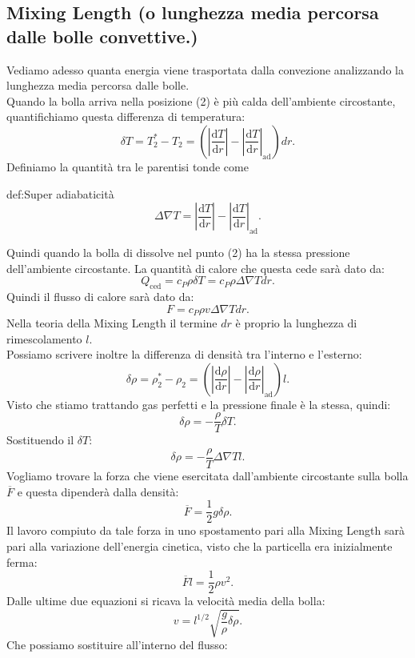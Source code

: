 \subsection{Mixing Length (o lunghezza media percorsa dalle bolle convettive.)}
\label{subsec:Mixing Length (o lunghezza media percorsa dalle bolle convettive.)}
Vediamo adesso quanta energia viene trasportata dalla convezione analizzando la lunghezza media percorsa dalle bolle.\\
Quando la  bolla arriva nella posizione (2) è più calda dell'ambiente circostante, quantifichiamo questa differenza di temperatura:
\[
	\delta  T =
	T_2^* - T_2
	=
	\left( \left| \frac{\mbox{d} T}{\mbox{d} r}  \right| 
		- 
	\left| \frac{\mbox{d} T}{\mbox{d} r}  \right| _\text{ad}  \right) dr
.\] 
Definiamo la quantità tra le parentisi tonde come
\begin{defn}{def:Super adiabaticità}
	\[
	\Delta\nabla T 
	=
	\left| \frac{\mbox{d} T}{\mbox{d} r}  \right| -
	\left| \frac{\mbox{d} T}{\mbox{d} r}  \right| _\text{ad} 
	.\] 
\end{defn}
Quindi quando la bolla di dissolve nel punto (2) ha la stessa pressione dell'ambiente circostante. La quantità di calore che questa cede sarà dato da:
\[
	Q_\text{ced} 
	=
	c_P \rho \delta T 
	=
	c_P\rho \Delta\nabla T dr
.\] 
Quindi il flusso di calore sarà dato da:
\[
	F = c_P \rho v \Delta\nabla T dr
.\] 
Nella teoria della Mixing Length il termine $dr$ è proprio la lunghezza di rimescolamento $l$.\\
Possiamo scrivere inoltre la differenza di densità tra l'interno e l'esterno:
\[
	\delta\rho =
	\rho^*_2 - \rho _2 
	=
	\left( \left| \frac{\mbox{d} \rho }{\mbox{d} r}  \right| 
	-
	\left| \frac{\mbox{d} \rho }{\mbox{d} r}  \right| _\text{ad}  \right) l
.\] 
Visto che stiamo trattando gas perfetti e la pressione finale è la stessa, quindi:
\[
	\delta\rho =
	-\frac{\rho }{T}\delta T
.\] 
Sostituendo il $\delta T$:
\[
	\delta\rho = - \frac{\rho }{T}\Delta\nabla T l
.\] 
Vogliamo trovare la forza che viene esercitata dall'ambiente circostante sulla bolla $\overline{F}$ e questa dipenderà dalla densità:
\[
	\overline{F} 
	=
	\frac{1}{2}g \delta\rho 
.\] 
Il lavoro compiuto da tale forza in uno spostamento pari alla Mixing Length sarà pari alla variazione dell'energia cinetica, visto che la particella era inizialmente ferma:
\[
	\overline{F}l 
	=
	\frac{1}{2}\rho v^2
.\] 
Dalle ultime due equazioni si ricava la velocità media della bolla:
\[
	v =
	l^{1/2}\sqrt{\frac{g}{\rho }\delta\rho } 
.\] 
Che possiamo sostituire all'interno del flusso:
